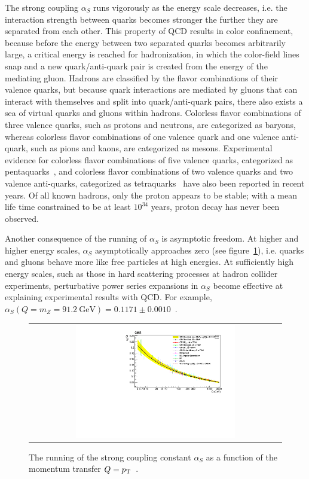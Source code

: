 The strong coupling $\alpha_S$ runs vigorously as the energy scale decreases, i.e. the interaction strength between quarks becomes stronger the further they are separated from each other.
This property of QCD results in color confinement, because before the energy between two separated quarks becomes arbitrarily large, a critical energy is reached for hadronization, in which the color-field lines snap and a new quark/anti-quark pair is created from the energy of the mediating gluon.
Hadrons are classified by the flavor combinations of their valence quarks, but because quark interactions are mediated by gluons that can interact with themselves and split into quark/anti-quark pairs, there also exists a sea of virtual quarks and gluons within hadrons.
Colorless flavor combinations of three valence quarks, such as protons and neutrons, are categorized as baryons, whereas colorless flavor combinations of one valence quark and one valence anti-quark, such as pions and kaons, are categorized as mesons.
Experimental evidence for colorless flavor combinations of five valence quarks, categorized as pentaquarks~\cite{PhysRevLett.115.072001}, and colorless flavor combinations of two valence quarks and two valence anti-quarks, categorized as tetraquarks~\cite{PhysRevLett.110.252002} have also been reported in recent years.
Of all known hadrons, only the proton appears to be stable; with a mean life time constrained to be at least $10^{34}$ years, proton decay has never been observed.

Another consequence of the running of $\alpha_S$ is asymptotic freedom.
At higher and higher energy scales, $\alpha_S$ asymptotically approaches zero (see figure~\ref{alphaS_running}), i.e. quarks and gluons behave more like free particles at high energies.
At sufficiently high energy scales, such as those in hard scattering processes at hadron collider experiments, perturbative power series expansions in $\alpha_S$ become effective at explaining experimental results with QCD.
For example, $\alpha_S(Q = m_Z =  \SI{91.2}{\GeV}) = 0.1171 \pm 0.0010$~\cite{PhysRevD.103.034028}.
\begin{figure}[htb]
  \begin{center}
    \begin{tabular}{c}
        \includegraphics[width=0.65\textwidth]{fig_Theory/alphaS_running.pdf}
    \end{tabular}
    \caption{The running of the strong coupling constant $\alpha_S$ as a function of the momentum transfer $Q = p_{\mathrm{T}}$~\cite{alphaS_running}.
            }
    \label{alphaS_running}
  \end{center}
\end{figure}

